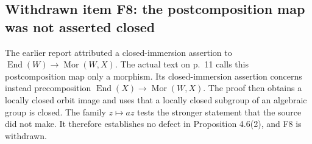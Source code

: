 \documentclass[10pt]{article}
\begin{document}
\subsection*{Withdrawn item F8: the postcomposition map was not asserted closed}
The earlier report attributed a closed-immersion assertion to \(\operatorname{End}(W)\to\operatorname{Mor}(W,X)\). The actual text on p. 11 calls this postcomposition map only a morphism. Its closed-immersion assertion concerns instead precomposition \(\operatorname{End}(X)\to\operatorname{Mor}(W,X)\). The proof then obtains a locally closed orbit image and uses that a locally closed subgroup of an algebraic group is closed. The family \(z\mapsto az\) tests the stronger statement that the source did not make. It therefore establishes no defect in Proposition 4.6(2), and F8 is withdrawn.\par
\end{document}
